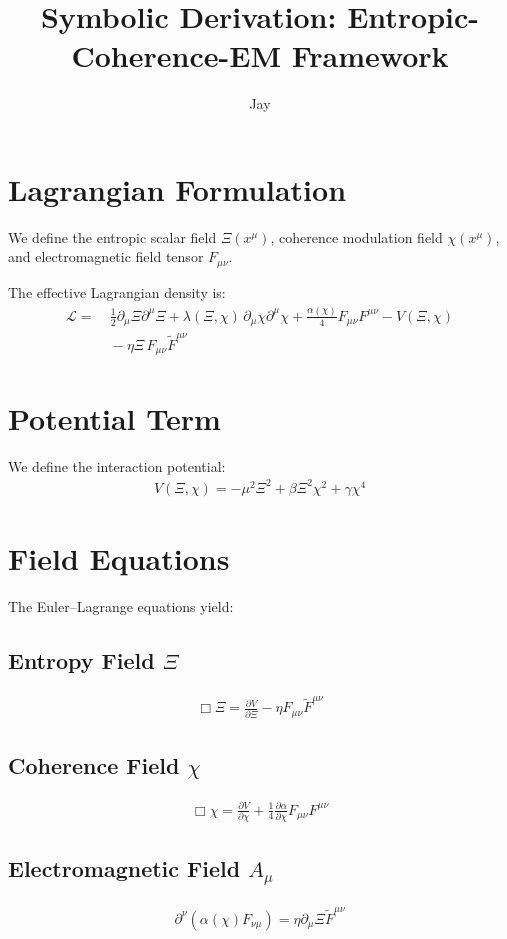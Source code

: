 \documentclass{article}
\title{Symbolic Derivation: Entropic-Coherence-EM Framework}
\author{Jay}
\date{}
\begin{document}
\maketitle

\section*{Lagrangian Formulation}

We define the entropic scalar field $\Xi(x^\mu)$, coherence modulation field $\chi(x^\mu)$, and electromagnetic field tensor $F_{\mu\nu}$.

The effective Lagrangian density is:
\begin{align}
\mathcal{L} = &\ \frac{1}{2} \partial_\mu \Xi \partial^\mu \Xi 
+ \lambda(\Xi, \chi)\, \partial_\mu \chi \partial^\mu \chi 
+ \frac{\alpha(\chi)}{4} F_{\mu\nu}F^{\mu\nu} 
- V(\Xi, \chi) \\
&\ - \eta \Xi\, F_{\mu\nu} \tilde{F}^{\mu\nu}
\end{align}

\section*{Potential Term}
We define the interaction potential:
\begin{align}
V(\Xi, \chi) = -\mu^2 \Xi^2 + \beta \Xi^2 \chi^2 + \gamma \chi^4
\end{align}

\section*{Field Equations}

The Euler–Lagrange equations yield:

\subsection*{Entropy Field $\Xi$}
\begin{align}
\Box \Xi = \frac{\partial V}{\partial \Xi} - \eta F_{\mu\nu} \tilde{F}^{\mu\nu}
\end{align}

\subsection*{Coherence Field $\chi$}
\begin{align}
\Box \chi = \frac{\partial V}{\partial \chi} + \frac{1}{4} \frac{\partial \alpha}{\partial \chi} F_{\mu\nu} F^{\mu\nu}
\end{align}

\subsection*{Electromagnetic Field $A_\mu$}
\begin{align}
\partial^\nu (\alpha(\chi) F_{\nu\mu}) = \eta \partial_\mu \Xi \tilde{F}^{\mu\nu}
\end{align}
\end{document}
